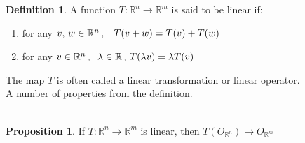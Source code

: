 \documentclass[11pt,a4paper]{article}
\theoremstyle{definition}
\newtheorem{defn}[thm]{Definition}
\newtheorem{prop}[thm]{Proposition}
\begin{document}
\begin{defn}
A function $T: \mathbb{R}^n  \longrightarrow \mathbb{R}^m$ is said to be linear if:
\begin{enumerate}
\item[(i)]  for any $v,\, w\in \mathbb{R}^n\, ,\hspace{0.3cm} T(v + w) = T(v) + T(w)$
\item[(ii)] for any $v\in \mathbb{R}^n\, ,\hspace{0.2cm} \lambda \in \mathbb{R}\,,\, T(\lambda v) = \lambda T(v)$
\end{enumerate}
The map $T$ is often called a linear transformation or linear operator.\\

A number of properties from the definition.\\\\
\end{defn}




\begin{prop}
If $T: \mathbb{R}^n \longrightarrow \mathbb{R}^m$ is linear, then $T(O_{\mathbb{R}^n}) \longrightarrow O_{\mathbb{R}^m}$\\
\end{prop}
\end{document}
